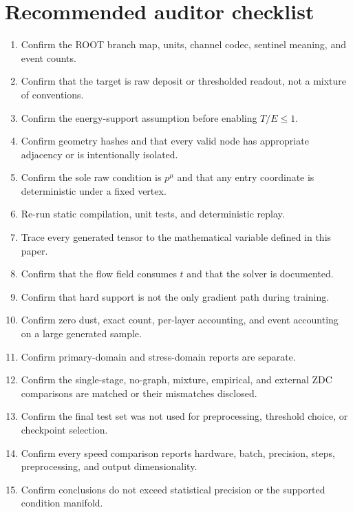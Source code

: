 \documentclass[11pt]{article}
\theoremstyle{definition}
\theoremstyle{remark}
\begin{document}
\section{Recommended auditor checklist}
\begin{enumerate}[leftmargin=2em]
  \item Confirm the ROOT branch map, units, channel codec, sentinel meaning, and event counts.
  \item Confirm that the target is raw deposit or thresholded readout, not a mixture of conventions.
  \item Confirm the energy-support assumption before enabling $T/E\le1$.
  \item Confirm geometry hashes and that every valid node has appropriate adjacency or is intentionally isolated.
  \item Confirm the sole raw condition is $p^\mu$ and that any entry coordinate is deterministic under a fixed vertex.
  \item Re-run static compilation, unit tests, and deterministic replay.
  \item Trace every generated tensor to the mathematical variable defined in this paper.
  \item Confirm that the flow field consumes $t$ and that the solver is documented.
  \item Confirm that hard support is not the only gradient path during training.
  \item Confirm zero dust, exact count, per-layer accounting, and event accounting on a large generated sample.
  \item Confirm primary-domain and stress-domain reports are separate.
  \item Confirm the single-stage, no-graph, mixture, empirical, and external ZDC comparisons are matched or their mismatches disclosed.
  \item Confirm the final test set was not used for preprocessing, threshold choice, or checkpoint selection.
  \item Confirm every speed comparison reports hardware, batch, precision, steps, preprocessing, and output dimensionality.
  \item Confirm conclusions do not exceed statistical precision or the supported condition manifold.
\end{enumerate}

\printbibliography[title={References}]
\end{document}
